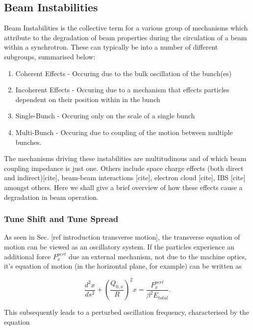 \subsection{Beam Instabilities}

Beam Instabilities is the collective term for a various group of mechanisms which attribute to the degradation of beam properties during the circulation of a beam within a synchrotron. These can typically be into a number of different subgroups, summarised below:

\begin{enumerate}
\item{Coherent Effects - Occuring due to the bulk oscillation of the bunch(es)}
\item{Incoherent Effects - Occuring due to a mechanism that effects particles dependent on their position within in the bunch}
\item{Single-Bunch - Occuring only on the scale of a single bunch}
\item{Multi-Bunch - Occuring due to coupling of the motion between multiple bunches}.
\end{enumerate}

The mechanisms driving these instabilities are multitudinous and of which beam coupling impedance is just one. Others include space charge effects (both direct and indirect)[cite], beam-beam interactions [cite], electron cloud [cite], IBS [cite] amongst others. Here we shall give a brief overview of how these effects cause a degradation in beam operation.

\subsubsection{Tune Shift and Tune Spread} 

As seen in Sec. [ref introduction transverse motion], the transverse equation of motion can be viewed as an oscillatory system. If the particles experience an additional force $ F^{pert}_{x}$ due an external mechanism, not due to the machine optics, it's equation of motion (in the horizontal plane, for example) can be written as

\begin{equation}
\frac{d^{2}x}{ds^{2}} + \left(\frac{Q_{0,x}}{R}\right)^{2} x = \frac{F^{pert}_{x}}{\beta^{2} E_{total}}.
\end{equation}

This subsequently leads to a perturbed oscillation frequency, characterised by the equation

